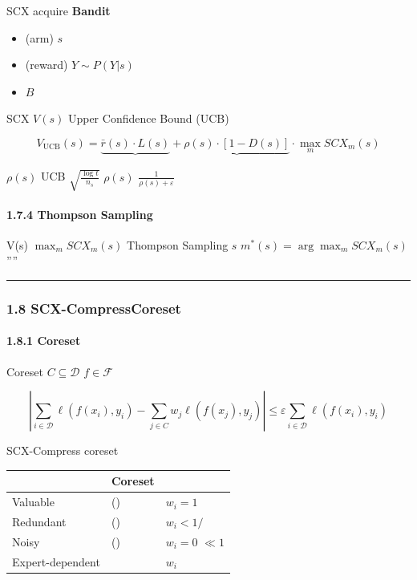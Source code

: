 \documentclass[
  12pt,
]{article}
\providecommand{\tightlist}{%
  \setlength{\itemsep}{0pt}\setlength{\parskip}{0pt}}
\begin{document}
SCX  acquire \textbf{ Bandit }

\begin{itemize}
\tightlist
\item
   (arm) \(s\) 
\item
   (reward) \(Y \sim P(Y|s)\) 
\item
   \(B\) 
\end{itemize}

SCX  \(V(s)\)  Upper Confidence Bound (UCB) 

\[V_{\text{UCB}}(s) = \underbrace{\bar{r}(s) \cdot L(s)}_{\text{}} + \underbrace{\rho(s) \cdot [1 - D(s)]}_{\text{}} \cdot \max_m SCX_m(s)\]

 \(\rho(s)\)  UCB 
\(\sqrt{\frac{\log t}{n_s}}\) \(\rho(s)\)
 \(\frac{1}{\rho(s) + \varepsilon}\) 

\paragraph{1.7.4 Thompson Sampling
}\label{thompson-sampling-ux8054ux7cfb}

V(s)  \(\max_m SCX_m(s)\)  Thompson Sampling
 \(s\) \(m^*(s) = \arg\max_m SCX_m(s)\)
''''

\begin{center}\rule{0.5\linewidth}{0.5pt}\end{center}

\subsubsection{1.8 SCX-CompressCoreset
}\label{scx-compresscoreset-ux4e0eux84b8ux998f}

\paragraph{1.8.1 Coreset
}\label{coreset-ux7406ux8bbaux57faux7840}

Coreset 
\(C \subseteq \mathcal{D}\) \(f \in \mathcal{F}\)

\[|\sum_{i \in \mathcal{D}} \ell(f(x_i), y_i) - \sum_{j \in C} w_j \ell(f(x_j), y_j)| \leq \varepsilon \sum_{i \in \mathcal{D}} \ell(f(x_i), y_i)\]

SCX-Compress  coreset

\begin{longtable}[]{@{}lll@{}}
\toprule\noalign{}
 & Coreset  &  \\
\midrule\noalign{}
\endhead
\bottomrule\noalign{}
\endlastfoot
Valuable &  () & \(w_i = 1\) \\
Redundant &  () & \(w_i < 1/\text{}\) \\
Noisy &  () & \(w_i = 0\)  \(\ll 1\) \\
Expert-dependent &  & \(w_i\)  \\
\end{longtable}
\end{document}
